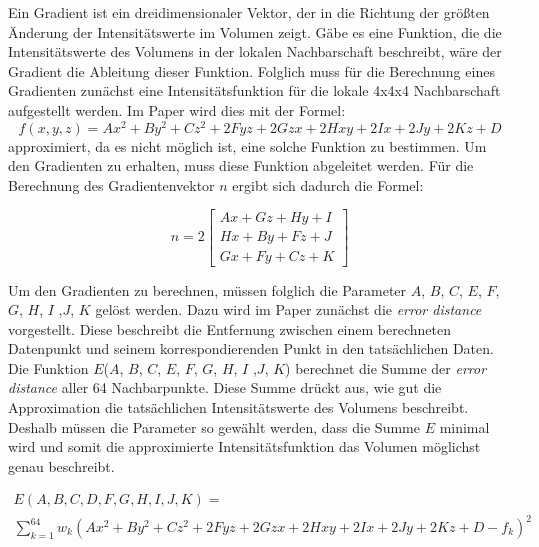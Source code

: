 Ein Gradient ist ein dreidimensionaler Vektor, der in die Richtung der größten Änderung der Intensitätswerte im Volumen zeigt. Gäbe es eine Funktion, die die Intensitätswerte des Volumens in der lokalen Nachbarschaft beschreibt, wäre der Gradient die Ableitung dieser Funktion. Folglich muss für die Berechnung eines Gradienten zunächst eine Intensitätsfunktion für die lokale 4x4x4 Nachbarschaft aufgestellt werden. Im Paper wird dies mit der Formel:
\begin{equation}
	f(x,y,z) = Ax^{2}+By^{2}+Cz^{2}+2Fyz+2Gzx+2Hxy+2Ix+2Jy+2Kz+D
\end{equation}
approximiert, da es nicht möglich ist, eine solche Funktion zu bestimmen. Um den Gradienten zu erhalten, muss diese Funktion abgeleitet werden. Für die Berechnung des Gradientenvektor $n$ ergibt sich dadurch die Formel:


\begin{equation}
	n =2\begin{bmatrix}
           Ax + Gz + Hy + I \\
           Hx + By + Fz + J \\
           Gx + Fy + Cz + K
         \end{bmatrix} 
\end{equation}

Um den Gradienten zu berechnen, müssen folglich die Parameter $A$, $B$, $C$, $E$, $F$, $G$, $H$, $I$ ,$J$, $K$ gelöst werden. Dazu wird im Paper zunächst die \textit{error distance} vorgestellt. Diese beschreibt die Entfernung zwischen einem berechneten Datenpunkt und seinem korrespondierenden Punkt in den tatsächlichen Daten. Die Funktion $E$($A$, $B$, $C$, $E$, $F$, $G$, $H$, $I$ ,$J$, $K$) berechnet die Summe der \textit{error distance} aller 64 Nachbarpunkte. Diese Summe drückt aus, wie gut die Approximation die tatsächlichen Intensitätswerte des Volumens beschreibt. Deshalb müssen die Parameter so gewählt werden, dass die Summe $E$ minimal wird und somit die approximierte Intensitätsfunktion das Volumen möglichst genau beschreibt.


\begin{equation}
\begin{array}{l}
  E(A,B,C,D,F,G,H,I,J,K) = \\
	\sum\limits_{k=1}^{64}  w_{k}(Ax^{2}+By^{2}+Cz^{2}+2Fyz+2Gzx+2Hxy+2Ix+2Jy+2Kz+D - f_{k})^2
\end{array}
\end{equation}


